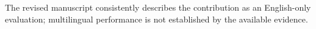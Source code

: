 The revised manuscript consistently describes the contribution as an English-only evaluation; multilingual performance is not established by the available evidence.
